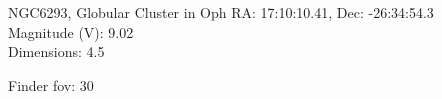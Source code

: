 \begin{block}{NGC6293, Globular Cluster in Oph}
    RA: 17:10:10.41, Dec: -26:34:54.3 \\ 
    Magnitude (V): 9.02 \\ 
    Dimensions: 4.5 

    Finder fov: 30 
\end{block}